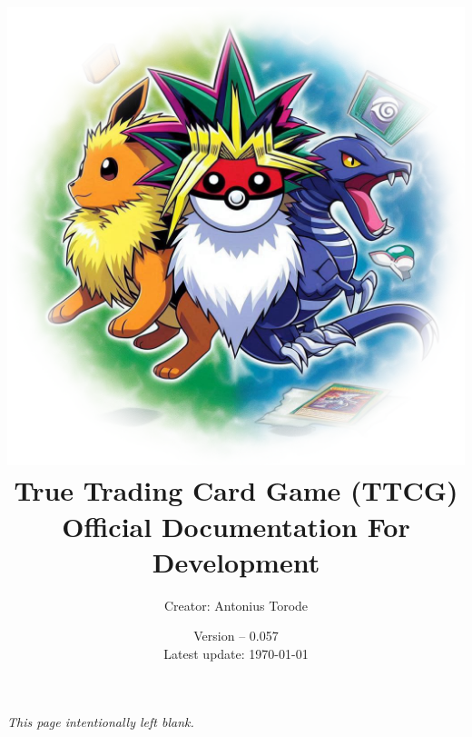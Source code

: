 \documentclass[openany,a4paper,10pt]{book}
\title{\vspace{0.1cm}  \includegraphics[scale=0.5]{./images/man_cover.png} \vspace{.5cm} \\ True Trading Card Game (TTCG) \\ Official Documentation For Development}
\author{Creator: Antonius Torode}
\date{Version -- 0.057 \\ Latest update: \today}
\begin{document}
\frontmatter
\maketitle

\tableofcontents
\newpage
\vspace*{\fill}
\begin{center}
	\textit{This page intentionally left blank.}
\end{center}
\vspace*{\fill}

\mainmatter
\pagestyle{fancy}
\fancyhf{}
\fancyhead[RO, LE]{\thepage}










\backmatter

%
\printindex
\end{document}
